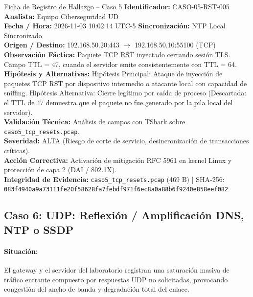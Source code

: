 \documentclass[11pt,letterpaper]{article}
\begin{document}
\begin{hallazgobox}{Ficha de Registro de Hallazgo -- Caso 5}
    \textbf{Identificador:} CASO-05-RST-005 \hfill \textbf{Analista:} Equipo Ciberseguridad UD\\
    \textbf{Fecha / Hora:} 2026-11-03 10:02:14 UTC-5 \hfill \textbf{Sincronización:} NTP Local Sincronizado\\
    \textbf{Origen / Destino:} 192.168.50.20:443 $\rightarrow$ 192.168.50.10:55100 (TCP)\\
    \textbf{Observación Fáctica:} Paquete TCP RST inyectado cerrando sesión TLS. Campo TTL = 47, cuando el servidor emite consistentemente con TTL = 64.\\
    \textbf{Hipótesis y Alternativas:} Hipótesis Principal: Ataque de inyección de paquetes TCP RST por dispositivo intermedio o atacante local con capacidad de sniffing. Hipótesis Alternativa: Cierre legítimo por caída de proceso (Descartada: el TTL de 47 demuestra que el paquete no fue generado por la pila local del servidor).\\
    \textbf{Validación Técnica:} Análisis de campos con TShark sobre \texttt{caso5\_tcp\_resets.pcap}.\\
    \textbf{Severidad:} ALTA (Riesgo de corte de servicio, desincronización de transacciones críticas).\\
    \textbf{Acción Correctiva:} Activación de mitigación RFC 5961 en kernel Linux y protección de capa 2 (DAI / 802.1X).\\
    \textbf{Integridad de Evidencia:} \texttt{caso5\_tcp\_resets.pcap} (469 B) | SHA-256: \texttt{083f4940a9a73111fe20f58628fa7febdf971f6ec8a0a88b6f9240e858eef082}
\end{hallazgobox}

\newpage
\subsection{Caso 6: UDP: Reflexión / Amplificación DNS, NTP o SSDP}

\paragraph{Situación:} El gateway y el servidor del laboratorio registran una saturación masiva de tráfico entrante compuesto por respuestas UDP no solicitadas, provocando congestión del ancho de banda y degradación total del enlace.
\end{document}
